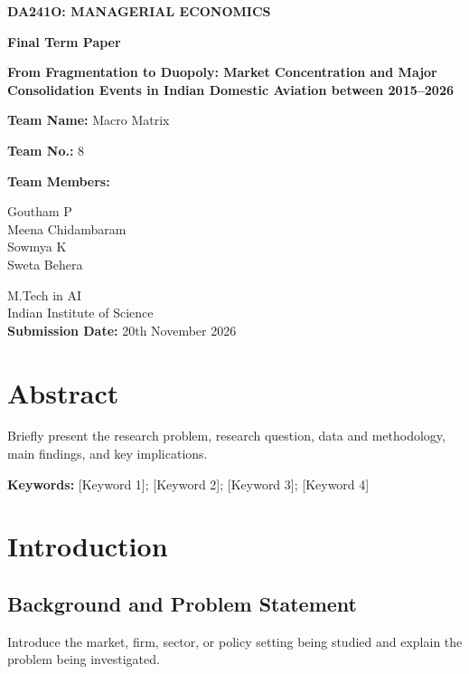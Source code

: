 \documentclass[12pt,a4paper]{article}
\begin{document}
\hypersetup{pageanchor=false}
\begin{titlepage}
\centering
\vspace*{1cm}
{\Large\bfseries DA241O: MANAGERIAL ECONOMICS\par}
\vspace{0.8cm}
{\LARGE\bfseries Final Term Paper\par}
\vspace{1cm}
{\Large\bfseries From Fragmentation to Duopoly: Market Concentration and Major Consolidation Events in Indian Domestic Aviation between 2015--2026\par}
\vspace{1cm}
{\large\textbf{Team Name:} Macro Matrix\par}
{\large\textbf{Team No.:} 8\par}
\vspace{0.75cm}
{\large\textbf{Team Members:}\par}
\vspace{0.3cm}
{\large Goutham P\\
Meena Chidambaram\\
Sowmya K\\
Sweta Behera\par}
\vfill
{\large M.Tech in AI\\
Indian Institute of Science\\[0.5cm]
\textbf{Submission Date:} 20th November 2026\par}
\end{titlepage}
\hypersetup{pageanchor=true}
\setcounter{page}{1}

\section*{Abstract}
Briefly present the research problem, research question, data and methodology, main findings, and key implications.

\vspace{0.5cm}
\textbf{Keywords:} [Keyword 1]; [Keyword 2]; [Keyword 3]; [Keyword 4]

\section{Introduction}
\subsection{Background and Problem Statement}
Introduce the market, firm, sector, or policy setting being studied and explain the problem being investigated.
\end{document}

